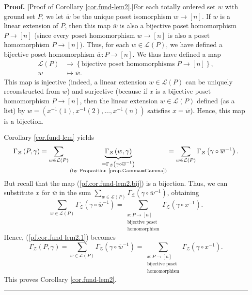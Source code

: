 \documentclass[numbers=enddot,12pt,final,onecolumn,notitlepage]{scrartcl}%
\theoremstyle{definition}
\newenvironment{proof}[1][Proof]{\noindent\textbf{#1.} }{\ \rule{0.5em}{0.5em}}
\let\sumnonlimits\sum
\renewcommand{\sum}{\sumnonlimits\limits}
\begin{document}
\begin{proof}
[Proof of Corollary \ref{cor.fund-lem2}.]For each totally ordered set $w$ with
ground set $P$, we let $\overline{w}$ be the unique poset isomorphism
$w\rightarrow\left[  n\right]  $. If $w$ is a linear extension of $P$, then
this map $\overline{w}$ is also a bijective poset homomorphism $P\rightarrow
\left[  n\right]  $ (since every poset homomorphism $w\rightarrow\left[
n\right]  $ is also a poset homomorphism $P\rightarrow\left[  n\right]  $).
Thus, for each $w\in\mathcal{L}\left(  P\right)  $, we have defined a
bijective poset homomorphism $\overline{w}:P\rightarrow\left[  n\right]  $. We
thus have defined a map%
\begin{align}
\mathcal{L}\left(  P\right)    & \rightarrow\left\{  \text{bijective poset
homomorphisms }P\rightarrow\left[  n\right]  \right\}  ,\nonumber\\
w  & \mapsto\overline{w}.\label{pf.cor.fund-lem2.bij}%
\end{align}
This map is injective (indeed, a linear extension $w\in\mathcal{L}\left(
P\right)  $ can be uniquely reconstructed from $\overline{w}$) and surjective
(because if $x$ is a bijective poset homomorphism $P\rightarrow\left[
n\right]  $, then the linear extension $w\in\mathcal{L}\left(  P\right)  $
defined (as a list) by $w=\left(  x^{-1}\left(  1\right)  ,x^{-1}\left(
2\right)  ,\ldots,x^{-1}\left(  n\right)  \right)  $ satisfies $x=\overline
{w}$). Hence, this map is a bijection. 

Corollary \ref{cor.fund-lem} yields%
\begin{equation}
\Gamma_{\mathcal{Z}}\left(  P,\gamma\right)  =\sum_{w\in\mathcal{L}\left(
P\right)  }\underbrace{\Gamma_{\mathcal{Z}}\left(  w,\gamma\right)
}_{\substack{=\Gamma_{\mathcal{Z}}\left(  \gamma\circ\overline{w}^{-1}\right)
\\\text{(by Proposition \ref{prop.Gamma=Gamma})}}}=\sum_{w\in\mathcal{L}%
\left(  P\right)  }\Gamma_{\mathcal{Z}}\left(  \gamma\circ\overline{w}%
^{-1}\right)  .\label{pf.cor.fund-lem2.1}%
\end{equation}
But recall that the map (\ref{pf.cor.fund-lem2.bij}) is a bijection. Thus, we
can substitute $x$ for $\overline{w}$ in the sum $\sum_{w\in\mathcal{L}\left(
P\right)  }\Gamma_{\mathcal{Z}}\left(  \gamma\circ\overline{w}^{-1}\right)  $,
obtaining%
\[
\sum_{w\in\mathcal{L}\left(  P\right)  }\Gamma_{\mathcal{Z}}\left(
\gamma\circ\overline{w}^{-1}\right)  =\sum_{\substack{x:P\rightarrow\left[
n\right]  \\\text{bijective poset}\\\text{homomorphism}}}\Gamma_{\mathcal{Z}%
}\left(  \gamma\circ x^{-1}\right)  .
\]
Hence, (\ref{pf.cor.fund-lem2.1}) becomes%
\[
\Gamma_{\mathcal{Z}}\left(  P,\gamma\right)  =\sum_{w\in\mathcal{L}\left(
P\right)  }\Gamma_{\mathcal{Z}}\left(  \gamma\circ\overline{w}^{-1}\right)
=\sum_{\substack{x:P\rightarrow\left[  n\right]  \\\text{bijective
poset}\\\text{homomorphism}}}\Gamma_{\mathcal{Z}}\left(  \gamma\circ
x^{-1}\right)  .
\]
This proves Corollary \ref{cor.fund-lem2}.
\end{proof}
\end{document}
